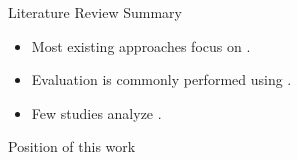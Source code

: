 \begin{frame}{Literature Review Summary}

\begin{itemize}
    \item Most existing approaches focus on .
    \item Evaluation is commonly performed using .
    \item Few studies analyze .
\end{itemize}

\vspace{0.45cm}

\begin{block}{Position of this work}
\end{block}

\end{frame}
